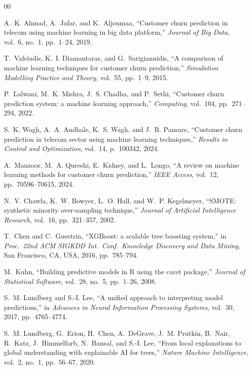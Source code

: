 \documentclass[10pt, conference, letterpaper]{IEEEtran}
\begin{document}
\begin{thebibliography}{00}

A.~K. Ahmad, A.~Jafar, and K.~Aljoumaa, ``Customer churn prediction in telecom using machine learning in big data platform,'' \textit{Journal of Big Data}, vol.~6, no.~1, pp.~1--24, 2019.

T.~Vafeiadis, K.~I. Diamantaras, and G.~Sarigiannidis, ``A comparison of machine learning techniques for customer churn prediction,'' \textit{Simulation Modelling Practice and Theory}, vol.~55, pp.~1--9, 2015.

P.~Lalwani, M.~K. Mishra, J.~S. Chadha, and P.~Sethi, ``Customer churn prediction system: a machine learning approach,'' \textit{Computing}, vol.~104, pp.~271--294, 2022.

S.~K. Wagh, A.~A. Andhale, K.~S. Wagh, and J.~R. Pansare, ``Customer churn prediction in telecom sector using machine learning techniques,'' \textit{Results in Control and Optimization}, vol.~14, p.~100342, 2024.

A.~Manzoor, M.~A. Qureshi, E.~Kidney, and L.~Longo, ``A review on machine learning methods for customer churn prediction,'' \textit{IEEE Access}, vol.~12, pp.~70596--70615, 2024.

N.~V. Chawla, K.~W. Bowyer, L.~O. Hall, and W.~P. Kegelmeyer, ``SMOTE: synthetic minority over-sampling technique,'' \textit{Journal of Artificial Intelligence Research}, vol.~16, pp.~321--357, 2002.

T.~Chen and C.~Guestrin, ``XGBoost: a scalable tree boosting system,'' in \textit{Proc.\ 22nd ACM SIGKDD Int.\ Conf.\ Knowledge Discovery and Data Mining}, San Francisco, CA, USA, 2016, pp.~785--794.

M.~Kuhn, ``Building predictive models in R using the caret package,'' \textit{Journal of Statistical Software}, vol.~28, no.~5, pp.~1--26, 2008.

S.~M. Lundberg and S.-I. Lee, ``A unified approach to interpreting model predictions,'' in \textit{Advances in Neural Information Processing Systems}, vol.~30, 2017, pp.~4765--4774.

S.~M. Lundberg, G.~Erion, H.~Chen, A.~DeGrave, J.~M. Prutkin, B.~Nair, R.~Katz, J.~Himmelfarb, N.~Bansal, and S.-I. Lee, ``From local explanations to global understanding with explainable AI for trees,'' \textit{Nature Machine Intelligence}, vol.~2, no.~1, pp.~56--67, 2020.


\end{thebibliography}
\end{document}
